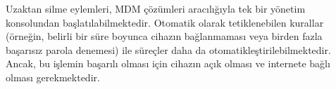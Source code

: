 Uzaktan silme eylemleri, MDM çözümleri aracılığıyla tek bir yönetim konsolundan başlatılabilmektedir. Otomatik olarak tetiklenebilen kurallar (örneğin, belirli bir süre boyunca cihazın bağlanmaması veya birden fazla başarısız parola denemesi) ile süreçler daha da otomatikleştirilebilmektedir. Ancak, bu işlemin başarılı olması için cihazın açık olması ve internete bağlı olması gerekmektedir.
